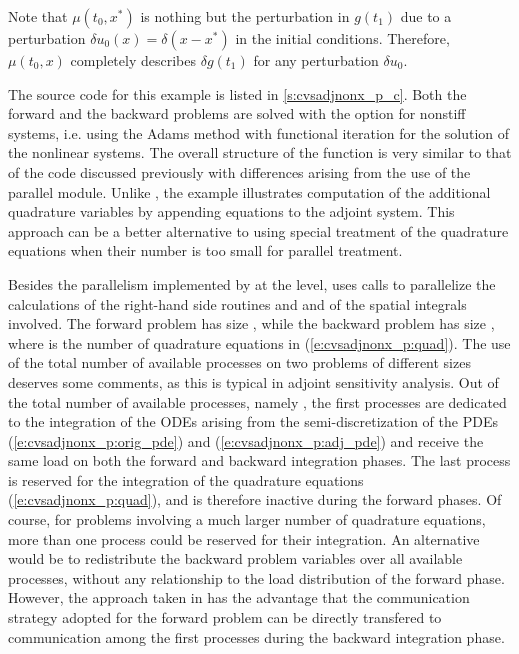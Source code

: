 Note that $\mu(t_0 , x^*)$ is nothing but the perturbation in $g(t_1)$
due to a perturbation $\delta u_0(x) = \delta(x-x^*)$ in the initial conditions.
Therefore, $\mu(t_0,x)$ completely describes $\delta g(t_1)$ for any
perturbation $\delta u_0$.

The source code for this example is listed in \A\ref{s:cvsadjnonx_p_c}. Both the forward
and the backward problems are solved with the option for nonstiff systems,
i.e. using the Adams method with functional iteration for the solution of
the nonlinear systems. The overall structure of the  function is very
similar to that of the code  discussed previously with 
differences arising from the use of the parallel {\nvector} module. Unlike 
, the example  illustrates computation of the additional
quadrature variables by appending  equations to the adjoint system.
This approach can be a better alternative to using special treatment
of the quadrature equations when their number is too small for parallel 
treatment.

Besides the parallelism implemented by {\cvodes} at the {\nvector} level,
 uses {\mpi} calls to parallelize the calculations of the right-hand side
routines  and  and of the spatial integrals involved.
The forward problem has size , while the backward problem has
size , where  is the number of quadrature equations
in (\ref{e:cvsadjnonx_p:quad}).
The use of the total number of available processes on two problems of different 
sizes deserves some comments, as this is typical in adjoint sensitivity 
analysis. Out of the total number of available processes, namely ,
the first  processes are dedicated to the integration of
the ODEs arising from the semi-discretization of the PDEs 
(\ref{e:cvsadjnonx_p:orig_pde}) and (\ref{e:cvsadjnonx_p:adj_pde}) and receive
the same load on both the forward and backward integration phases. 
The last process is reserved for the integration of the quadrature equations 
(\ref{e:cvsadjnonx_p:quad}), and is therefore inactive during the forward phases.
Of course, for problems involving a much larger number of quadrature equations,
more than one process could be reserved for their integration. 
An alternative would be to redistribute the  backward problem variables 
over all available processes, without any relationship to the load distribution 
of the forward phase. However, the approach taken in  has the 
advantage that the communication strategy adopted for the forward problem 
can be directly transfered to communication among the first 
processes during the backward integration phase. 

